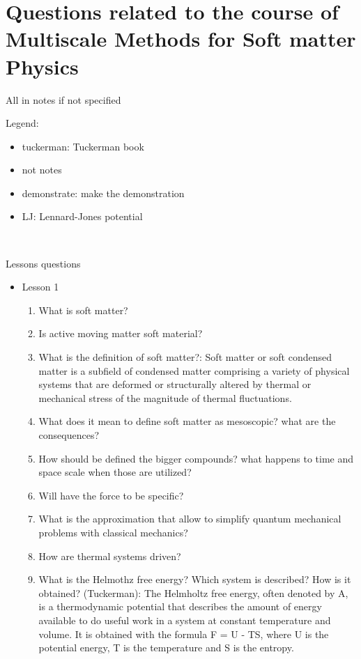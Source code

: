 \section{Questions related to the course of Multiscale Methods for Soft matter Physics}

All in notes if not specified\\
\small{
Legend:
\begin{itemize}
    \item tuckerman: Tuckerman book
    \item not notes
    \item demonstrate: make the demonstration
    \item LJ: Lennard-Jones potential
\end{itemize}
}
\hfill \\
\small{
Lessons questions
\begin{itemize}
    \item Lesson 1
    \begin{enumerate}
        \item What is soft matter?
        \item Is active moving matter soft material?
        \item What is the definition of soft matter?: Soft matter or soft condensed matter is a subfield of condensed matter comprising a variety of physical systems that are deformed or structurally altered by thermal or mechanical stress of the magnitude of thermal fluctuations.
        \item What does it mean to define soft matter as mesoscopic? what are the consequences?
        \item How should be defined the bigger compounds? what happens to time and space scale when those are utilized?
        \item Will have the force to be specific?
        \item What is the approximation that  allow to simplify quantum mechanical problems with classical mechanics?
        \item How are thermal systems driven?
        \item What is the Helmothz free energy? Which system is described? How is it obtained? (Tuckerman): The Helmholtz free energy, often denoted by A, is a thermodynamic potential that describes the amount of energy available to do useful work in a system at constant temperature and volume. It is obtained with the formula F = U - TS, where U is the potential energy, T is the temperature and S is the entropy.

\end{enumerate}
\end{itemize}}
